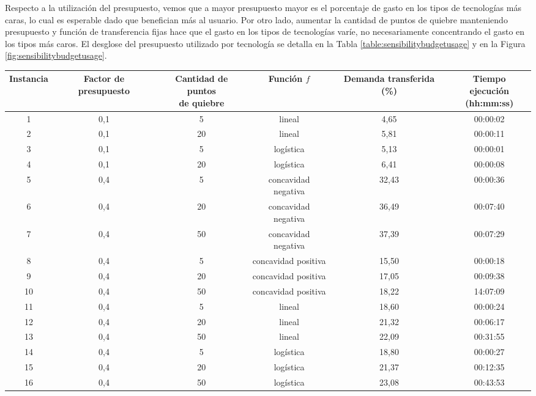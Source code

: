 Respecto a la utilización del presupuesto, vemos que a mayor presupuesto mayor es el porcentaje de gasto en los tipos de tecnologías más caras, lo cual es esperable dado que benefician más al usuario. Por otro lado, aumentar la cantidad de puntos de quiebre manteniendo presupuesto y función de transferencia fijas hace que el gasto en los tipos de tecnologías varíe, no necesariamente concentrando el gasto en los tipos más caros. El desglose del presupuesto utilizado por tecnología se detalla en la Tabla \ref{table:sensibilitybudgetusage} y en la Figura \ref{fig:sensibilitybudgetusage}.

\begin{table}
  \centering
  \begin{tabular}{cccccc}
      \toprule
      Instancia & Factor de presupuesto & \shortstack{Cantidad de puntos \\ de quiebre} & Función $f$ & Demanda transferida (\%) & \shortstack{Tiempo ejecución \\ (hh:mm:ss)} \\
      \midrule
      1 & 0,1 & 5 & lineal & 4,65 & 00:00:02 \\
      2 & 0,1 & 20 & lineal & 5,81 & 00:00:11 \\
      3 & 0,1 & 5 & logística & 5,13 & 00:00:01 \\
      4 & 0,1 & 20 & logística & 6,41 & 00:00:08 \\
      5 & 0,4 & 5 & concavidad negativa & 32,43 & 00:00:36 \\
      6 & 0,4 & 20 & concavidad negativa & 36,49 & 00:07:40 \\
      7 & 0,4 & 50 & concavidad negativa & 37,39 & 00:07:29 \\
      8 & 0,4 & 5 & concavidad positiva & 15,50 & 00:00:18 \\
      9 & 0,4 & 20 & concavidad positiva & 17,05 & 00:09:38 \\
      10 & 0,4 & 50 & concavidad positiva & 18,22 & 14:07:09 \\
      11 & 0,4 & 5 & lineal & 18,60 & 00:00:24 \\
      12 & 0,4 & 20 & lineal & 21,32 & 00:06:17 \\
      13 & 0,4 & 50 & lineal & 22,09 & 00:31:55 \\
      14 & 0,4 & 5 & logística & 18,80 & 00:00:27 \\
      15 & 0,4 & 20 & logística & 21,37 & 00:12:35 \\
      16 & 0,4 & 50 & logística & 23,08 & 00:43:53 \\

\end{tabular}
\end{table}
